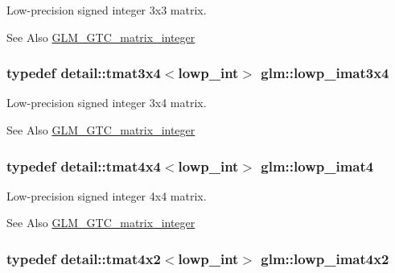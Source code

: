 Low-\/precision signed integer 3x3 matrix. 

\begin{DoxySeeAlso}{See Also}
\hyperlink{group__gtc__matrix__integer}{G\-L\-M\-\_\-\-G\-T\-C\-\_\-matrix\-\_\-integer} 
\end{DoxySeeAlso}
\hypertarget{group__gtc__matrix__integer_gaefcf7682fee103d6f8c9315420a6bcd5}{
\subsubsection[{lowp\-\_\-imat3x4}]{\setlength{\rightskip}{0pt plus 5cm}typedef detail\-::tmat3x4$<$lowp\-\_\-int$>$ {\bf glm\-::lowp\-\_\-imat3x4}}}\label{group__gtc__matrix__integer_gaefcf7682fee103d6f8c9315420a6bcd5}


Low-\/precision signed integer 3x4 matrix. 

\begin{DoxySeeAlso}{See Also}
\hyperlink{group__gtc__matrix__integer}{G\-L\-M\-\_\-\-G\-T\-C\-\_\-matrix\-\_\-integer} 
\end{DoxySeeAlso}
\hypertarget{group__gtc__matrix__integer_ga644e005864dce94a642fcfe939538deb}{
\subsubsection[{lowp\-\_\-imat4}]{\setlength{\rightskip}{0pt plus 5cm}typedef detail\-::tmat4x4$<$lowp\-\_\-int$>$ {\bf glm\-::lowp\-\_\-imat4}}}\label{group__gtc__matrix__integer_ga644e005864dce94a642fcfe939538deb}


Low-\/precision signed integer 4x4 matrix. 

\begin{DoxySeeAlso}{See Also}
\hyperlink{group__gtc__matrix__integer}{G\-L\-M\-\_\-\-G\-T\-C\-\_\-matrix\-\_\-integer} 
\end{DoxySeeAlso}
\hypertarget{group__gtc__matrix__integer_ga6b4261f0c13ebc56e2bc76bf7170830c}{
\subsubsection[{lowp\-\_\-imat4x2}]{\setlength{\rightskip}{0pt plus 5cm}typedef detail\-::tmat4x2$<$lowp\-\_\-int$>$ {\bf glm\-::lowp\-\_\-imat4x2}}}\label{group__gtc__matrix__integer_ga6b4261f0c13ebc56e2bc76bf7170830c}


